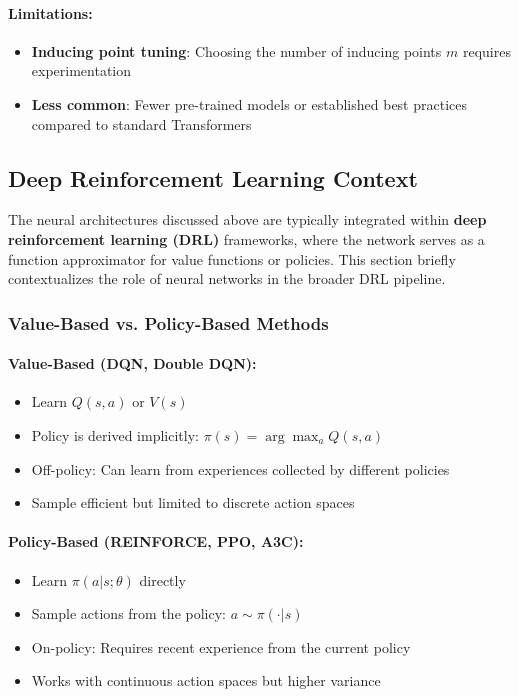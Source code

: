\paragraph{Limitations:}

\begin{itemize}
\item \textbf{Inducing point tuning}: Choosing the number of inducing points $m$ requires experimentation
\item \textbf{Less common}: Fewer pre-trained models or established best practices compared to standard Transformers
\end{itemize}


\subsection{Deep Reinforcement Learning Context}

The neural architectures discussed above are typically integrated within \textbf{deep reinforcement learning (DRL)} frameworks, where the network serves as a function approximator for value functions or policies. This section briefly contextualizes the role of neural networks in the broader DRL pipeline.

\subsubsection{Value-Based vs. Policy-Based Methods}

\paragraph{Value-Based (DQN, Double DQN):}

\begin{itemize}
\item Learn $Q(s, a)$ or $V(s)$
\item Policy is derived implicitly: $\pi(s) = \arg\max_a Q(s, a)$
\item Off-policy: Can learn from experiences collected by different policies
\item Sample efficient but limited to discrete action spaces
\end{itemize}

\paragraph{Policy-Based (REINFORCE, PPO, A3C):}

\begin{itemize}
\item Learn $\pi(a|s; \theta)$ directly
\item Sample actions from the policy: $a \sim \pi(\cdot|s)$
\item On-policy: Requires recent experience from the current policy
\item Works with continuous action spaces but higher variance
\end{itemize}

